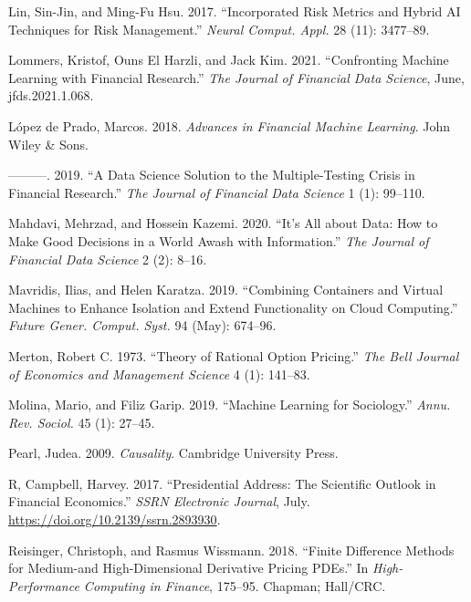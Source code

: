 \documentclass{article}
\newlength{\cslhangindent}
\newlength{\cslentryspacingunit} %
\newenvironment{CSLReferences}[2] %
 {%
  \setlength{\parindent}{0pt}
  \ifodd #1
  \let\oldpar\par
  \def\par{\hangindent=\cslhangindent\oldpar}
  \fi
  \setlength{\parskip}{#2\cslentryspacingunit}
 }%
 {}
\begin{document}
\begin{CSLReferences}{1}{0}
\leavevmode{}%
Lin, Sin-Jin, and Ming-Fu Hsu. 2017. {``Incorporated Risk Metrics and
Hybrid {AI} Techniques for Risk Management.''} \emph{Neural Comput.
Appl.} 28 (11): 3477--89.

\leavevmode{}%
Lommers, Kristof, Ouns El Harzli, and Jack Kim. 2021. {``Confronting
Machine Learning with Financial Research.''} \emph{The Journal of
Financial Data Science}, June, jfds.2021.1.068.

\leavevmode{}%
López de Prado, Marcos. 2018. \emph{Advances in Financial Machine
Learning}. John Wiley \& Sons.

\leavevmode{}%
---------. 2019. {``A Data Science Solution to the {Multiple-Testing}
Crisis in Financial Research.''} \emph{The Journal of Financial Data
Science} 1 (1): 99--110.

\leavevmode{}%
Mahdavi, Mehrzad, and Hossein Kazemi. 2020. {``It's All about Data: How
to Make Good Decisions in a World Awash with Information.''} \emph{The
Journal of Financial Data Science} 2 (2): 8--16.

\leavevmode{}%
Mavridis, Ilias, and Helen Karatza. 2019. {``Combining Containers and
Virtual Machines to Enhance Isolation and Extend Functionality on Cloud
Computing.''} \emph{Future Gener. Comput. Syst.} 94 (May): 674--96.

\leavevmode{}%
Merton, Robert C. 1973. {``Theory of Rational Option Pricing.''}
\emph{The Bell Journal of Economics and Management Science} 4 (1):
141--83.

\leavevmode{}%
Molina, Mario, and Filiz Garip. 2019. {``Machine Learning for
Sociology.''} \emph{Annu. Rev. Sociol.} 45 (1): 27--45.

\leavevmode{}%
Pearl, Judea. 2009. \emph{Causality}. Cambridge University Press.

\leavevmode{}%
R, Campbell, Harvey. 2017. {``{Presidential Address: The Scientific
Outlook in Financial Economics}.''} \emph{SSRN Electronic Journal},
July. \url{https://doi.org/10.2139/ssrn.2893930}.

\leavevmode{}%
Reisinger, Christoph, and Rasmus Wissmann. 2018. {``Finite Difference
Methods for Medium-and High-Dimensional Derivative Pricing {PDEs}.''} In
\emph{{High-Performance} Computing in Finance}, 175--95. Chapman;
Hall/CRC.


\end{CSLReferences}
\end{document}
